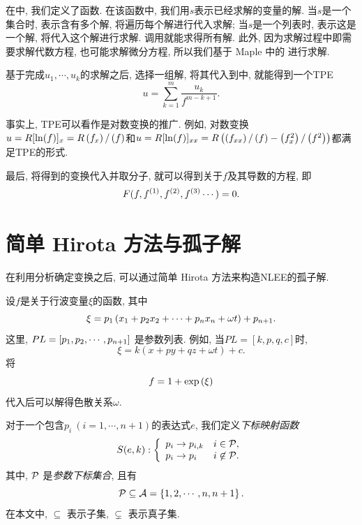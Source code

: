 在中, 我们定义了函数. 在该函数中, 我们用$s$表示已经求解的变量的解. 当$s$是一个集合时, 表示含有多个解, 将遍历每个解进行代入求解; 当$s$是一个列表时, 表示这是一个解, 将代入这个解进行求解. 调用就能求得所有解. 此外, 因为求解过程中即需要求解代数方程, 也可能求解微分方程, 所以我们基于 Maple 中的  进行求解. 

基于完成$u_1,\cdots,u_k$的求解之后, 选择一组解, 将其代入到中, 就能得到一个TPE
\begin{equation}
u=\sum_{k=1}^m{\frac{u_k}{f^{m-k+1}}}.    
\end{equation}

事实上, TPE可以看作是对数变换的推广. 例如, 对数变换$u=R[\ln(f)]_x=R\left(f_x\right)/\left(f\right)$和$u=R[\ln(f)]_{xx}=R\left(\left(f_{xx}\right)/\left(f\right)-\left(f_x^2\right)/\left(f^2\right)\right)$都满足TPE的形式.

最后, 将得到的变换代入并取分子, 就可以得到关于$f$及其导数的方程, 即
\begin{equation}
    F(f,f^{(1)},f^{(2)},f^{(3)}\cdots)=0. \label{feq}
\end{equation}

\section{简单 Hirota 方法与孤子解}
在利用\Painleve{}分析确定变换之后, 可以通过简单 Hirota 方法来构造NLEE的孤子解. 

设$f$是关于行波变量$\xi$的函数, 其中
\begin{equation}
    \xi=p_1\left(x_1+p_2x_2+\cdots+p_nx_n+\omega t\right)+p_{n+1}. \label{tw}
\end{equation}
这里, $PL=\left[p_1,p_2,\cdots,p_{n+1}\right]$ 是参数列表. 例如, 当$PL=[k,p,q,c]$时, 
\begin{equation}
    \xi=k(x+py+qz+\omega t)+c.
\end{equation}
将
\begin{equation}
    f=1+\exp\left(\xi\right) \label{1-soliton}
\end{equation}
代入后可以解得色散关系$\omega$. 

对于一个包含$p_i~(i=1,\cdots,n+1)$的表达式$e$, 我们定义\emph{下标映射函数}
\begin{equation}
    S(e,k): \left\{\begin{array}{ll}
        p_i \rightarrow p_{i,k} & i \in \mathcal{P}, \\ 
        p_i \rightarrow p_i & i \not\in \mathcal{P}.
    \end{array}\right.
\end{equation}
其中, $\mathcal{P}$ 是\emph{参数下标集合}, 且有 
\begin{equation}
    \mathcal{P}\subseteq  \mathcal{A}=\left\{1,2,\cdots,n,n+1\right\}.
\end{equation}
在本文中, $\subseteq$ 表示子集, $\subsetneq$ 表示真子集. 

